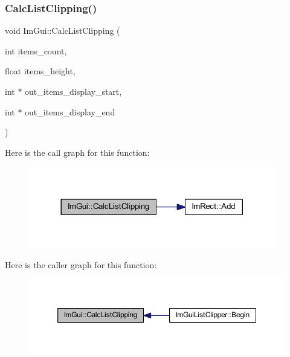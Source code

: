 \subsubsection{\texorpdfstring{Calc\+List\+Clipping()}{CalcListClipping()}}
{\footnotesize\ttfamily void Im\+Gui\+::\+Calc\+List\+Clipping (\begin{DoxyParamCaption}\item[{int}]{items\+\_\+count,  }\item[{float}]{items\+\_\+height,  }\item[{int $\ast$}]{out\+\_\+items\+\_\+display\+\_\+start,  }\item[{int $\ast$}]{out\+\_\+items\+\_\+display\+\_\+end }\end{DoxyParamCaption})}

Here is the call graph for this function\+:
\nopagebreak
\begin{figure}[H]
\begin{center}
\leavevmode
\includegraphics[width=305pt]{namespace_im_gui_ae5319370628374ef8febf0c25c285b7e_cgraph}
\end{center}
\end{figure}
Here is the caller graph for this function\+:
\nopagebreak
\begin{figure}[H]
\begin{center}
\leavevmode
\includegraphics[width=350pt]{namespace_im_gui_ae5319370628374ef8febf0c25c285b7e_icgraph}
\end{center}
\end{figure}
\mbox{\label{namespace_im_gui_a848b9db6cc4a186751c0ecebcaadc33b}} 
